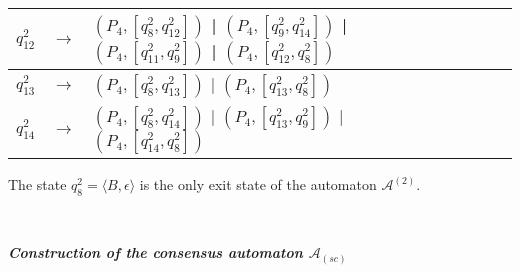 \begin{table}[ht]
\begin{tabular}[t]{|lcp{5.7cm}|lcp{5cm}|}
	\hline
	
	$q_{12}^{2}$ & $\longrightarrow$ & $(P_{4}, [q_{8}^{2}, q_{12}^{2}])$ | $(P_{4}, [q_{9}^{2}, q_{14}^{2}])$ | $(P_{4}, [q_{11}^{2}, q_{9}^{2}])$ | $(P_{4}, [q_{12}^{2}, q_{8}^{2}])$ & & &\\
	
	\hline
	
	$q_{13}^{2}$ & $\longrightarrow$ & $(P_{4}, [q_{8}^{2}, q_{13}^{2}])$ | $(P_{4}, [q_{13}^{2}, q_{8}^{2}])$ & & &\\
	
	\hline
	
	$q_{14}^{2}$ & $\longrightarrow$ & $(P_{4}, [q_{8}^{2}, q_{14}^{2}])$ | $(P_{4}, [q_{13}^{2}, q_{9}^{2}])$ | $(P_{4}, [q_{14}^{2}, q_{8}^{2}])$ & & &\\
	\hline
	\end{tabular}
\end{table}
The state $q_{8}^{2}=\langle B,\epsilon \rangle$ is the only exit state of the automaton $\mathcal{A}^{(2)}$. 


~

\noindent\textbf{\textit{Construction of the consensus automaton $\mathcal{A}_{(sc)}$}}

